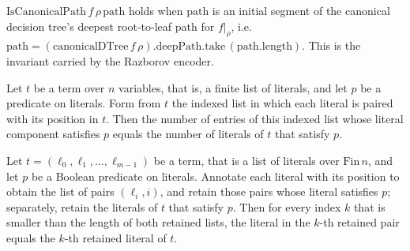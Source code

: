 \begin{definition}
\label{SwitchingLemma.IsCanonicalPath}
\leanok
{}
$\mathrm{IsCanonicalPath}\,f\,\rho\,\mathrm{path}$ holds when $\mathrm{path}$ is an
initial segment of the canonical decision tree's deepest root-to-leaf path for
$f|_\rho$, i.e.\ $\mathrm{path} = (\mathrm{canonicalDTree}\,f\,\rho).\mathrm{deepPath}.\mathrm{take}\,(\mathrm{path.length})$.
This is the invariant carried by the Razborov encoder.
\end{definition}

\begin{lemma}
\label{SwitchingLemma.zipIdx_filter_length}
\leanok
{}
Let $t$ be a term over $n$ variables, that is, a finite list of literals, and let $p$ be
a predicate on literals. Form from $t$ the indexed list in which each literal is paired
with its position in $t$. Then the number of entries of this indexed list whose literal
component satisfies $p$ equals the number of literals of $t$ that satisfy $p$.
\end{lemma}

\begin{lemma}
\label{SwitchingLemma.zipIdx_filter_getElem_fst}
\leanok
{}
Let $t = (\ell_0,\ell_1,\dots,\ell_{m-1})$ be a term, that is a list of literals over
$\mathrm{Fin}\,n$, and let $p$ be a Boolean predicate on literals. Annotate each literal
with its position to obtain the list of pairs $(\ell_i, i)$, and retain those pairs
whose literal satisfies $p$; separately, retain the literals of $t$ that satisfy $p$.
Then for every index $k$ that is smaller than the length of both retained lists, the
literal in the $k$-th retained pair equals the $k$-th retained literal of $t$.
\end{lemma}

